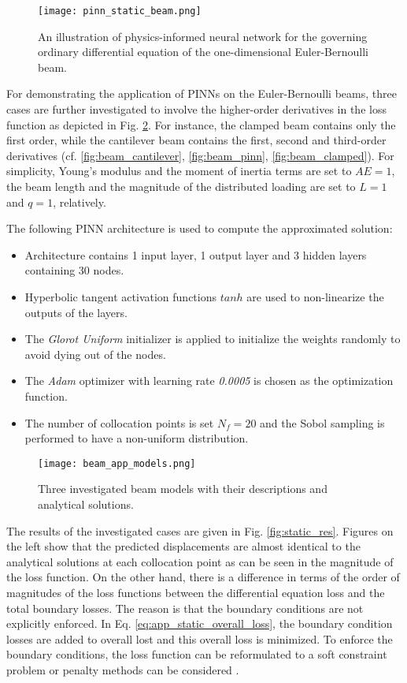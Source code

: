 \begin{figure}[!ht]
    \centering
    \texttt{[image: pinn\_static\_beam.png]}  
    \caption{An illustration of physics-informed neural network for the governing ordinary differential
    equation of the one-dimensional Euler-Bernoulli beam.}
    \label{fig:pinn_static_beam}
\end{figure}

For demonstrating the application of PINNs on the Euler-Bernoulli beams, three cases are further
investigated to involve the higher-order derivatives in the loss function as depicted 
in Fig. \ref{fig:beam_app_models}. For instance,
the clamped beam contains only the first order, while the cantilever beam contains the first, 
second and third-order derivatives (cf. \ref{fig:beam_cantilever}, \ref{fig:beam_pinn},
\ref{fig:beam_clamped}). For simplicity, Young's modulus and the moment of inertia terms are
set to $AE=1$, the beam length and the magnitude of the distributed loading are set to $L=1$ and $q=1$, relatively.

\vspace{5mm}
The following PINN architecture is used to compute the approximated solution:
\begin{itemize}
    \item Architecture contains 1 input layer, 1 output layer and 3 hidden layers
    containing 30 nodes.
    \item Hyperbolic tangent activation functions $tanh$ are used to non-linearize the outputs of the layers.
    \item The \textit{Glorot Uniform} initializer is applied to initialize the weights randomly to
    avoid dying out of the nodes.
    \item The \textit{Adam} optimizer with learning rate \textit{0.0005} is chosen as the optimization function.
    \item The number of collocation points is set $N_{f}=20$ and the Sobol sampling
    is performed to have a non-uniform distribution. 
\end{itemize}


\begin{figure}[!ht]
    \centering
    \texttt{[image: beam\_app\_models.png]}  
    \caption{Three investigated beam models with their descriptions and analytical solutions.}
    \label{fig:beam_app_models}
\end{figure}

The results of the investigated cases are given in Fig. \ref{fig:static_res}. Figures on the left show that the
predicted displacements are almost identical to the analytical solutions at each collocation point as can be seen
in the magnitude of the loss function. On the other hand, there is a difference in terms of the order of magnitudes
of the loss functions between the differential equation loss and the total boundary losses. 
The reason is that the boundary conditions are not explicitly enforced. In Eq. \ref{eq:app_static_overall_loss}, 
the boundary condition losses are added to overall lost and this overall loss is minimized. To enforce the boundary
conditions, the loss function can be reformulated to a soft constraint problem or penalty methods can be considered
\cite{lu2021physics}.     

